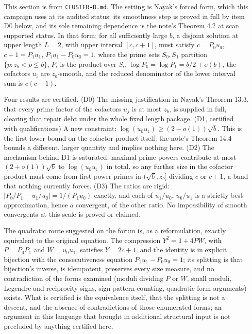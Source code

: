 \documentclass[11pt]{article}
\theoremstyle{remark}
\begin{document}
This section is from \texttt{CLUSTER-D.md}. The setting is Nayak's forced form, which this campaign uses at its audited status: its smoothness step is proved in full by item D0 below, and its sole remaining dependence is the note's Theorem 4.2 at scan supported status. In that form: for all sufficiently large $b$, a disjoint solution at upper length $L = 2$, with upper interval $[c, c+1]$, must satisfy $c = P_0 u_0$, $c + 1 = P_1 u_1$, $P_1 u_1 - P_0 u_0 = 1$, where the prime sets $S_0, S_1$ partition $\{p : z_b < p \le b\}$, $P_i$ is the product over $S_i$, $\log P_0 = \log P_1 = b/2 + o(b)$, the cofactors $u_i$ are $z_b$-smooth, and the reduced denominator of the lower interval sum is $c(c+1)$.

Four results are certified. (D0) The missing justification in Nayak's Theorem 13.3, that every prime factor of the cofactors $u_j$ is at most $z_b$, is supplied in full, clearing that repair debt under the whole fixed length package. (D1, certified with qualifications) A new constraint: $\log(u_0 u_1) \ge (2 - o(1))\sqrt{b}$. This is the first lower bound on the cofactor product itself; the note's Theorem 14.4 bounds a different, larger quantity and implies nothing here. (D2) The mechanism behind D1 is saturated: maximal prime powers contribute at most $(2 + o(1))\sqrt{b}$ to $\log(u_0 u_1)$ in total, so any further size in the cofactor product must come from first power primes in $(\sqrt{b}, z_b]$ dividing $c$ or $c+1$, a band that nothing currently forces. (D3) The ratios are rigid: $|P_0/P_1 - u_1/u_0| = 1/(P_1 u_0)$ exactly, and each of $u_1/u_0$, $u_0/u_1$ is a strictly best approximation, hence a convergent, of the other ratio. No impossibility of smooth convergents at this scale is proved or claimed.

The quadratic route suggested on the forum is, as a reformulation, exactly equivalent to the original equation. The compression $Y^2 = 1 + 4PW$, with $P = P_0 P_1$ and $W = u_0 u_1$, satisfies $Y = 2c + 1$, and the identity is in explicit bijection with the consecutiveness equation $P_1 u_1 - P_0 u_0 = 1$; its splitting is that bijection's inverse, is idempotent, preserves every size measure, and no contradiction of the forms examined (moduli dividing $P$ or $W$, small moduli, Legendre and reciprocity signs, sign pattern counting, quadratic form arguments) exists. What is certified is the equivalence itself, that the splitting is not a descent, and the absence of contradictions of those enumerated forms; an argument in this language that brought in additional structural input is not precluded by anything certified here.
\end{document}
